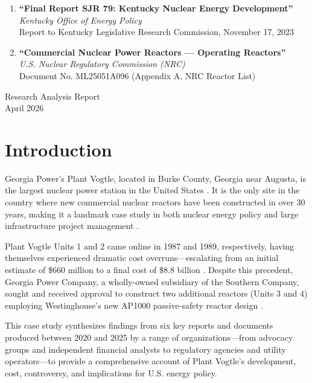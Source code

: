 \documentclass[12pt,a4paper]{article}
\begin{document}
\begin{titlepage}
\begin{mdframed}[backgroundcolor=lightgray, linecolor=nuclearblue, linewidth=1pt]
\begin{enumerate}[leftmargin=1.5em, label=\textbf{\arabic*.}]
    \item \textbf{``Final Report SJR 79: Kentucky Nuclear Energy Development''} \\
          \textit{Kentucky Office of Energy Policy} \\
          Report to Kentucky Legislative Research Commission, November 17, 2023

    \item \textbf{``Commercial Nuclear Power Reactors --- Operating Reactors''} \\
          \textit{U.S. Nuclear Regulatory Commission (NRC)} \\
          Document No. ML25051A096 (Appendix A, NRC Reactor List)
\end{enumerate}
\end{mdframed}

\vfill
{\normalsize Research Analysis Report \\ April 2026}
\end{titlepage}

\tableofcontents
\newpage

\section{Introduction}

Georgia Power's Plant Vogtle, located in Burke County, Georgia near Augusta, is the
largest nuclear power station in the United States \cite{durand_truth,nrc_ml25051}.
It is the only site in the country
where new commercial nuclear reactors have been constructed in over 30 years,
making it a landmark case study in both nuclear energy policy and large infrastructure
project management \cite{durand_truth}.

Plant Vogtle Units 1 and 2 came online in 1987 and 1989, respectively, having
themselves experienced dramatic cost overruns---escalating from an initial estimate
of \$660 million to a final cost of \$8.8 billion \cite{schlissel_ieefa}. Despite this precedent, Georgia Power
Company, a wholly-owned subsidiary of the Southern Company, sought and received
approval to construct two additional reactors (Units 3 and 4) employing Westinghouse's
new AP1000 passive-safety reactor design \cite{schlissel_ieefa,gpsc_2008}.

This case study synthesizes findings from six key reports and documents produced
between 2020 and 2025 by a range of organizations---from advocacy groups and
independent financial analysts to regulatory agencies and utility operators---to provide
a comprehensive account of Plant Vogtle's development, cost, controversy, and
implications for U.S. energy policy.
\end{document}
